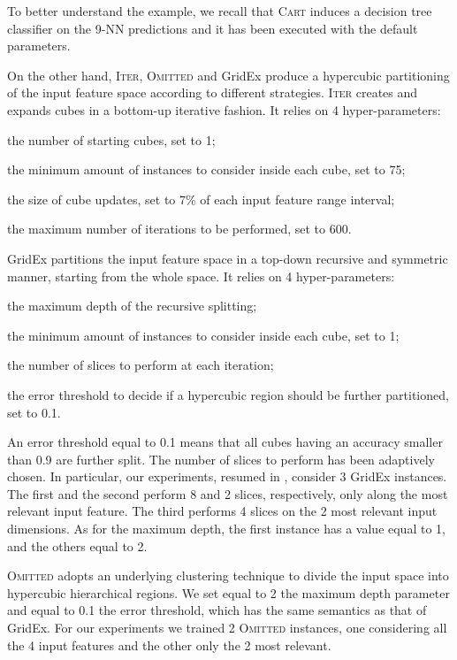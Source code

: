 \documentclass{article}
\newcommand{\iter}{\textsc{Iter}}
\newcommand{\gridex}{GridEx}
\newcommand{\creepy}{\textsc{Omitted}} %
\newcommand{\cart}{\textsc{Cart}}
\newenvironment{inlinelist}{\begin{enumerate*}[label=\emph{(\roman{*})}]}{\end{enumerate*}}
\begin{document}
To better understand the example, we recall that \cart{} induces a decision tree classifier on the 9-NN predictions and it has been executed with the default parameters.

On the other hand, \iter{}, \creepy{} and \gridex{} produce a hypercubic partitioning of the input feature space according to different strategies.
%
\iter{} creates and expands cubes in a bottom-up iterative fashion.
%
It relies on 4 hyper-parameters:
%
\begin{inlinelist}
	\item the number of starting cubes, set to 1;
	\item the minimum amount of instances to consider inside each cube, set to 75;
	\item the size of cube updates, set to 7\% of each input feature range interval;
	\item the maximum number of iterations to be performed, set to 600.
\end{inlinelist}

\gridex{} partitions the input feature space in a top-down recursive and symmetric manner, starting from the whole space.
%
It relies on 4 hyper-parameters:
%
\begin{inlinelist}
	\item the maximum depth of the recursive splitting;
	\item the minimum amount of instances to consider inside each cube, set to 1;
	\item the number of slices to perform at each iteration;
	\item the error threshold to decide if a hypercubic region should be further partitioned, set to 0.1.
\end{inlinelist}
%
An error threshold equal to 0.1 means that all cubes having an accuracy smaller than 0.9 are further split.
%
The number of slices to perform has been adaptively chosen.
%
In particular, our experiments, resumed in , consider 3 \gridex{} instances.
%
The first and the second perform 8 and 2 slices, respectively, only along the most relevant input feature.
%
The third performs 4 slices on the 2 most relevant input dimensions.
%
As for the maximum depth, the first instance has a value equal to 1, and the others equal to 2.

\creepy{} adopts an underlying clustering technique to divide the input space into hypercubic hierarchical regions.
%
We set equal to 2 the maximum depth parameter and equal to 0.1 the error threshold, which has the same semantics as that of \gridex{}.
%
For our experiments we trained 2 \creepy{} instances, one considering all the 4 input features and the other only the 2 most relevant.
\end{document}
